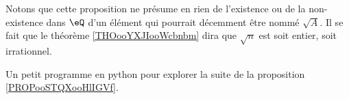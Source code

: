 Notons que cette proposition ne présume en rien de l'existence ou de la non-existence dans \( \eQ\) d'un élément qui pourrait décemment être nommé \( \sqrt{ A }\). Il se fait que le théorème \ref{THOooYXJIooWcbnbm} dira que \( \sqrt{ n }\) est soit entier, soit irrationnel.

\begin{normaltext}
	Un petit programme en python pour explorer la suite de la proposition \ref{PROPooSTQXooHlIGVf}.
	
\end{normaltext}
